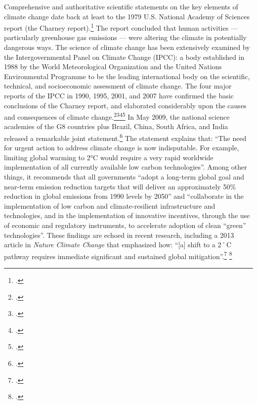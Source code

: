 Comprehensive and authoritative scientific statements on the key elements of climate change date back at least to the 1979 U.S. National Academy of Sciences report (the Charney report).\footcite[][]{Charney1979}
The report concluded that human activities --- particularly greenhouse gas emissions --- were altering the climate in potentially dangerous ways.
The science of climate change has been extensively examined by the Intergovernmental Panel on Climate Change (IPCC): a body established in 1988 by the World Meteorological Organization and the United Nations Environmental Programme to be the leading international body on the scientific, technical, and socio­economic assessment of climate change.
The four major reports of the IPCC in 1990, 1995, 2001, and 2007 have confirmed the basic conclusions of the Charney report, and elaborated considerably upon the causes and consequences of climate change.\footcite[][]{IPCC1990}\footcite[][]{IPCC1995}\footcite[][]{IPCC2001}\footcite[][]{IPCC2007}
In May 2009, the national science academies of the G8 countries plus Brazil, China, South Africa, and India released a remarkable joint statement.\footcite[][]{G8plusJointStatement}
The statement explains that: ``The need for urgent action to address climate change is now indisputable. For example, limiting global warming to 2°C would require a very rapid worldwide implementation of all currently available low carbon technologies''.
Among other things, it recommends that all governments ``adopt a long-term global goal and near-term emission reduction targets that will deliver an approximately 50\% reduction in global emissions from 1990 levels by 2050'' and ``collaborate in the implementation of low carbon and climate-resilient infrastructure and technologies, and in the implementation of innovative incentives, through the use of economic and regulatory instruments, to accelerate adoption of clean “green” technologies''.
These findings are echoed in recent research, including a 2013 article in \emph{Nature Climate Change} that emphasized how: ``[a] shift to a 2˚C pathway requires immediate significant and sustained global mitigation''.\footcite[][p. 1]{ChallengeTwoDegrees} \footcite[See also: ][]{EmissionTargetsTwoDegrees}



